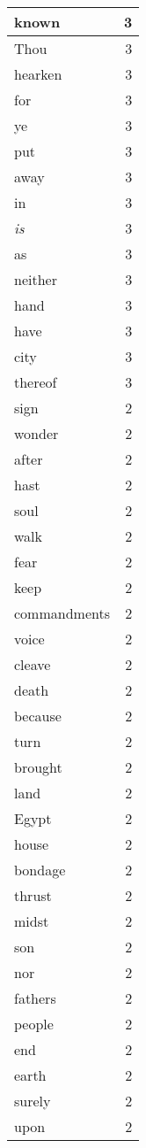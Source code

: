 \begin{center}
\begin{longtable}{l|r}
known & 3 \\ \hline
Thou & 3 \\ \hline
hearken & 3 \\ \hline
for & 3 \\ \hline
ye & 3 \\ \hline
put & 3 \\ \hline
away & 3 \\ \hline
in & 3 \\ \hline
\emph{is} & 3 \\ \hline
as & 3 \\ \hline
neither & 3 \\ \hline
hand & 3 \\ \hline
have & 3 \\ \hline
city & 3 \\ \hline
thereof & 3 \\ \hline
sign & 2 \\ \hline
wonder & 2 \\ \hline
after & 2 \\ \hline
hast & 2 \\ \hline
soul & 2 \\ \hline
walk & 2 \\ \hline
fear & 2 \\ \hline
keep & 2 \\ \hline
commandments & 2 \\ \hline
voice & 2 \\ \hline
cleave & 2 \\ \hline
death & 2 \\ \hline
because & 2 \\ \hline
turn & 2 \\ \hline
brought & 2 \\ \hline
land & 2 \\ \hline
Egypt & 2 \\ \hline
house & 2 \\ \hline
bondage & 2 \\ \hline
thrust & 2 \\ \hline
midst & 2 \\ \hline
son & 2 \\ \hline
nor & 2 \\ \hline
fathers & 2 \\ \hline
people & 2 \\ \hline
end & 2 \\ \hline
earth & 2 \\ \hline
surely & 2 \\ \hline
upon & 2 \\ \hline

\end{longtable}
\end{center}
